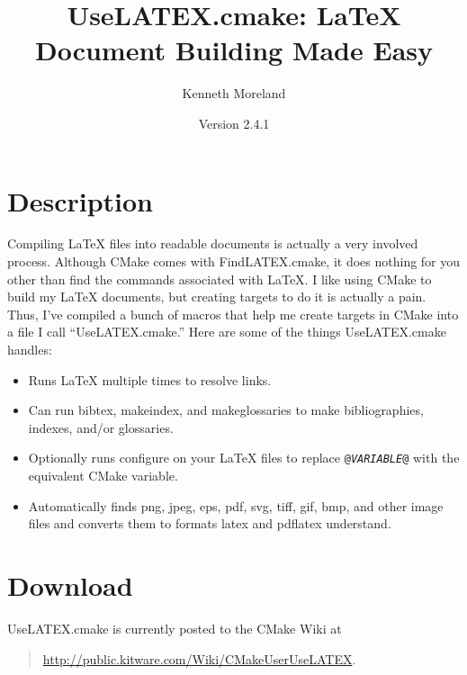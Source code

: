 \documentclass{article}
\newcommand{\UseLATEXVersion}{2.4.1}
\newcommand*{\textfile}[1]{\textsf{#1}}
\newcommand*{\textprog}[1]{\textfile{#1}}
\newcommand*{\textcmake}[1]{\texttt{#1}}
\newcommand*{\textvar}[1]{\textit{#1}}
\newcommand*{\UseLATEX}{\textfile{UseLATEX.cmake}\xspace}
\newcommand*{\latex}{\LaTeX\xspace}
\begin{document}
  \sloppy

  \title{UseLATEX.cmake: \latex Document Building Made Easy}
  \author{Kenneth Moreland}
  \date{Version \UseLATEXVersion}
  \maketitle

  \tableofcontents


  \section{Description}
  \label{sec:Description}

  Compiling \latex files into readable documents is actually a very
  involved process. Although CMake comes with \textfile{FindLATEX.cmake},
  it does nothing for you other than find the commands associated with
  \latex. I like using CMake to build my \latex documents, but creating
  targets to do it is actually a pain. Thus, I've compiled a bunch of
  macros that help me create targets in CMake into a file I call
  ``\UseLATEX.'' Here are some of the things \UseLATEX handles:

  \begin{itemize}
  \item Runs \latex multiple times to resolve links.
  \item Can run \textprog{bibtex}, \textprog{makeindex}, and
    \textprog{makeglossaries} to make bibliographies, indexes, and/or
    glossaries.
  \item Optionally runs configure on your \latex files to replace
    \textcmake{@\textvar{VARIABLE}@} with the equivalent CMake variable.
  \item Automatically finds png, jpeg, eps, pdf, svg, tiff, gif, bmp, and
    other image files and converts them to formats \textprog{latex} and
    \textprog{pdflatex} understand.
  \end{itemize}


  \section{Download}
  \label{sec:Download}

  \UseLATEX is currently posted to the CMake Wiki at
  \begin{quote}
    \href{http://public.kitware.com/Wiki/CMakeUserUseLATEX}{http://public.kitware.com/Wiki/CMakeUserUseLATEX}.
  \end{quote}
\end{document}
